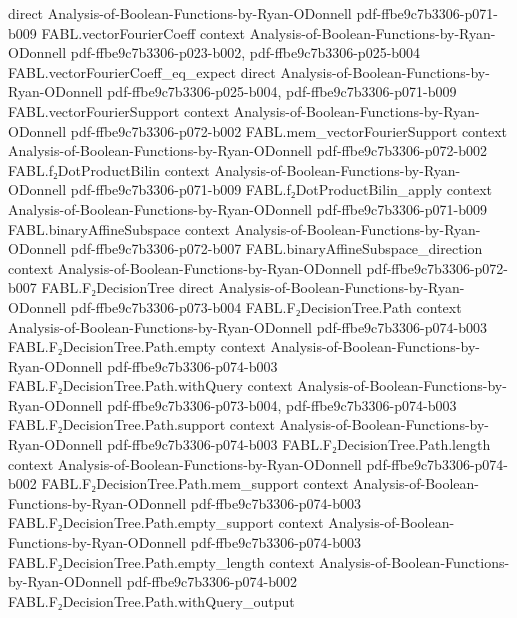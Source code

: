 \begin{theorem}
  {direct}
  {Analysis-of-Boolean-Functions-by-Ryan-ODonnell}
  {pdf-ffbe9c7b3306-p071-b009}
\proofstep
  {FABL.vectorFourierCoeff}
  {context}
  {Analysis-of-Boolean-Functions-by-Ryan-ODonnell}
  {pdf-ffbe9c7b3306-p023-b002,
    pdf-ffbe9c7b3306-p025-b004}
\proofstep
  {FABL.vectorFourierCoeff_eq_expect}
  {direct}
  {Analysis-of-Boolean-Functions-by-Ryan-ODonnell}
  {pdf-ffbe9c7b3306-p025-b004,
    pdf-ffbe9c7b3306-p071-b009}
\proofstep
  {FABL.vectorFourierSupport}
  {context}
  {Analysis-of-Boolean-Functions-by-Ryan-ODonnell}
  {pdf-ffbe9c7b3306-p072-b002}
\proofstep
  {FABL.mem_vectorFourierSupport}
  {context}
  {Analysis-of-Boolean-Functions-by-Ryan-ODonnell}
  {pdf-ffbe9c7b3306-p072-b002}
\proofstep
  {FABL.f₂DotProductBilin}
  {context}
  {Analysis-of-Boolean-Functions-by-Ryan-ODonnell}
  {pdf-ffbe9c7b3306-p071-b009}
\proofstep
  {FABL.f₂DotProductBilin_apply}
  {context}
  {Analysis-of-Boolean-Functions-by-Ryan-ODonnell}
  {pdf-ffbe9c7b3306-p071-b009}
\proofstep
  {FABL.binaryAffineSubspace}
  {context}
  {Analysis-of-Boolean-Functions-by-Ryan-ODonnell}
  {pdf-ffbe9c7b3306-p072-b007}
\proofstep
  {FABL.binaryAffineSubspace_direction}
  {context}
  {Analysis-of-Boolean-Functions-by-Ryan-ODonnell}
  {pdf-ffbe9c7b3306-p072-b007}
\proofstep
  {FABL.F₂DecisionTree}
  {direct}
  {Analysis-of-Boolean-Functions-by-Ryan-ODonnell}
  {pdf-ffbe9c7b3306-p073-b004}
\proofstep
  {FABL.F₂DecisionTree.Path}
  {context}
  {Analysis-of-Boolean-Functions-by-Ryan-ODonnell}
  {pdf-ffbe9c7b3306-p074-b003}
\proofstep
  {FABL.F₂DecisionTree.Path.empty}
  {context}
  {Analysis-of-Boolean-Functions-by-Ryan-ODonnell}
  {pdf-ffbe9c7b3306-p074-b003}
\proofstep
  {FABL.F₂DecisionTree.Path.withQuery}
  {context}
  {Analysis-of-Boolean-Functions-by-Ryan-ODonnell}
  {pdf-ffbe9c7b3306-p073-b004,
    pdf-ffbe9c7b3306-p074-b003}
\proofstep
  {FABL.F₂DecisionTree.Path.support}
  {context}
  {Analysis-of-Boolean-Functions-by-Ryan-ODonnell}
  {pdf-ffbe9c7b3306-p074-b003}
\proofstep
  {FABL.F₂DecisionTree.Path.length}
  {context}
  {Analysis-of-Boolean-Functions-by-Ryan-ODonnell}
  {pdf-ffbe9c7b3306-p074-b002}
\proofstep
  {FABL.F₂DecisionTree.Path.mem_support}
  {context}
  {Analysis-of-Boolean-Functions-by-Ryan-ODonnell}
  {pdf-ffbe9c7b3306-p074-b003}
\proofstep
  {FABL.F₂DecisionTree.Path.empty_support}
  {context}
  {Analysis-of-Boolean-Functions-by-Ryan-ODonnell}
  {pdf-ffbe9c7b3306-p074-b003}
\proofstep
  {FABL.F₂DecisionTree.Path.empty_length}
  {context}
  {Analysis-of-Boolean-Functions-by-Ryan-ODonnell}
  {pdf-ffbe9c7b3306-p074-b002}
\proofstep
  {FABL.F₂DecisionTree.Path.withQuery_output}

\end{theorem}
